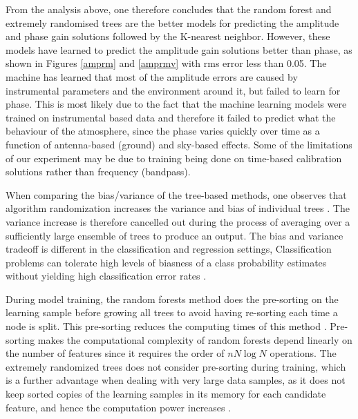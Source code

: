 From the analysis above, one therefore concludes that the random forest and extremely randomised trees are the better models for predicting the amplitude and phase gain solutions followed by the K-nearest neighbor. However, these models have learned to predict the amplitude gain solutions better than phase, as shown in Figures \ref{amprm} and \ref{amprmv} with rms  error less than 0.05. The machine has learned that most of the amplitude errors are caused by instrumental parameters and the environment around it, but failed to learn for phase. This is most likely due to the fact that the machine learning models were trained on instrumental based data and  therefore it failed to predict what the behaviour of the atmosphere, since the phase varies quickly over time as a function of antenna-based (ground) and sky-based effects. Some of the limitations of our experiment may be due to training being done on time-based calibration solutions rather than frequency (bandpass). 

When comparing the bias/variance of the tree-based methods, one observes that algorithm randomization increases the variance and bias of individual trees \citep{geurts2006extremely}. The variance increase is therefore cancelled out during the process of averaging over a sufficiently large ensemble of trees to produce an output. The bias and variance tradeoff is different in the classification and regression settings, Classification problems can tolerate high levels of biasness  of a class probability estimates without yielding high classification error rates \citep{geurts2006extremely}. 

During model training, the random forests method does the pre-sorting on the learning sample before growing all trees to avoid having re-sorting  each time a node is split. This pre-sorting reduces the computing times of this method \citep{geurts2006extremely}. Pre-sorting makes the computational complexity of random forests depend linearly on the number of features since it requires the order of $nN\log N$ operations. The extremely randomized trees does not consider pre-sorting during training, which is a further advantage when dealing with very large data samples, as it does not keep sorted copies of the learning samples in its memory for each candidate feature, and hence the computation power increases \citep{geurts2006extremely}.



